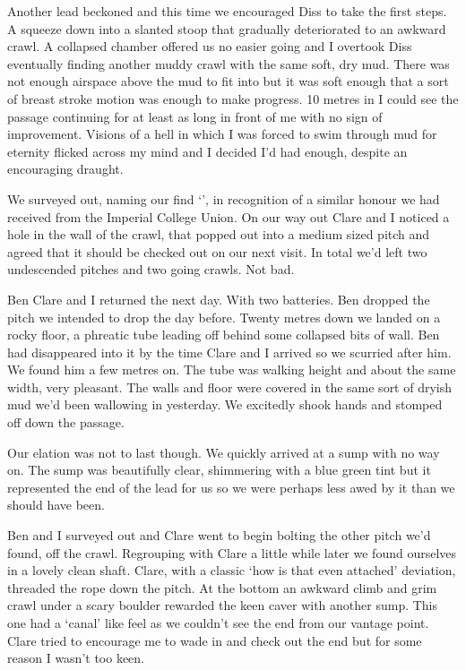 Another lead beckoned and this time we encouraged Diss to take the first steps. A squeeze down into a slanted stoop that gradually deteriorated to an awkward crawl. A collapsed chamber offered us no easier going and I overtook Diss eventually finding another muddy crawl with the same soft, dry mud. There was not enough airspace above the mud to fit into but it was soft enough that a sort of breast stroke motion was enough to make progress. 10 metres in I could see the passage continuing for at least as long in front of me with no sign of improvement. Visions of a hell in which I was forced to swim through mud for eternity flicked across my mind and I decided I'd had enough, despite an encouraging draught.
 
We surveyed out, naming our find `', in recognition of a similar honour we had received from the Imperial College Union. On our way out Clare and I noticed a hole in the wall of the crawl, that popped out into a medium sized pitch and agreed that it should be checked out on our next visit. In total we'd left two undescended pitches and two going crawls. Not bad.
 
    
    Ben Clare and I returned the next day. With two batteries. Ben dropped the pitch we intended to drop the day before. Twenty metres down we landed on a rocky floor, a phreatic tube leading off behind some collapsed bits of wall. Ben had disappeared into it by the time Clare and I arrived so we scurried after him. We found him a few metres on. The tube was walking height and about the same width, very pleasant. The walls and floor were covered in the same sort of dryish mud we'd been wallowing in yesterday. We excitedly shook hands and stomped off down the passage.
 
Our elation was not to last though. We quickly arrived at a sump with no way on. The sump was beautifully clear, shimmering with a blue green tint but it represented the end of the lead for us so we were perhaps less awed by it than we should have been.
 
Ben and I surveyed out and Clare went to begin bolting the other pitch we'd found, off the crawl. Regrouping with Clare a little while later we found ourselves in a lovely clean shaft. Clare, with a classic `how is that even attached' deviation, threaded the rope down the pitch. At the bottom an awkward climb and grim crawl under a scary boulder rewarded the keen caver with another sump. This one had a `canal' like feel as we couldn't see the end from our vantage point. Clare tried to encourage me to wade in and check out the end but for some reason I wasn't too keen.
 
